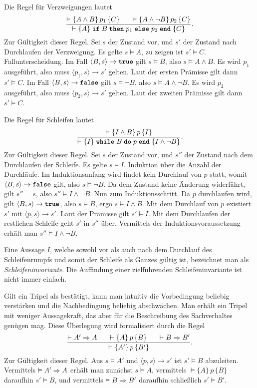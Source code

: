 Die Regel für Verzweigungen lautet
\[\dfrac{\vdash\{A\land B\}\,p_1\,\{C\}\quad\;\;\vdash\{A\land\lnot B\}\,p_2\,\{C\}}
{\vdash\{A\}\;\kw{if}\;B\;\kw{then}\;p_1\;\kw{else}\;p_2\;\kw{end}\;\{C\}}.\]
Zur Gültigkeit dieser Regel. Sei $s$ der Zustand vor, und $s'$ der
Zustand nach Durchlaufen der Verzweigung. Es gelte $s\models A$, zu
zeigen ist $s'\models C$. Fallunterscheidung. Im Fall
$\langle B,s\rangle\to\kw{true}$
gilt $s\models B$, also $s\models A\land B$. Es wird $p_1$ ausgeführt,
also muss $\langle p_1,s\rangle\to s'$ gelten. Laut der ersten Prämisse
gilt dann $s'\models C$. Im Fall $\langle B,s\rangle\to\kw{false}$
gilt $s\models\lnot B$, also $s\models A\land\lnot B$. Es wird $p_2$
ausgeführt, also muss $\langle p_2,s\rangle\to s'$ gelten. Laut der
zweiten Prämisse gilt dann $s'\models C$.

Die Regel für Schleifen lautet
\[\dfrac{\vdash\{I\land B\}\,p\,\{I\}}
{\vdash\{I\}\;\kw{while}\;B\;\kw{do}\;p\;\kw{end}\;\{I\land\lnot B\}}.\]
Zur Gültigkeit dieser Regel. Sei $s$ der Zustand vor, und $s''$
der Zustand nach dem Durchlaufen der Schleife. Es gelte $s\models I$.
Induktion über die Anzahl der Durchläufe. Im Induktionsanfang wird findet
kein Durchlauf von  $p$ statt, womit $\langle B,s\rangle\to\kw{false}$
gilt, also $s\models\lnot B$. Da dem Zustand keine Änderung widerfährt,
gilt $s''=s$, also $s''\models I\land\lnot B$.
Nun zum Induktionsschritt. Da $p$ durchlaufen wird, gilt
$\langle B,s\rangle\to\kw{true}$, also $s\models B$,
ergo $s\models I\land B$. Mit dem Durchlauf von $p$ existiert
$s'$ mit $\langle p,s\rangle\to s'$. Laut der Prämisse gilt
$s'\models I$. Mit dem Durchlaufen der restlichen Schleife geht $s'$
in $s''$ über. Vermittels der Induktionsvoraussetzung erhält man
$s''\models I\land\lnot B$.

Eine Aussage $I$, welche sowohl vor als auch nach dem Durchlauf des
Schleifenrumpfs und somit der Schleife als Ganzes gültig ist, bezeichnet
man als \emph{Schleifeninvariante}. Die Auffindung einer zielführenden
Schleifeninvariante ist nicht immer einfach.

Gilt ein Tripel als bestätigt, kann man intuitiv die Vorbedingung beliebig
verstärken und die Nachbedingung beliebig abschwächen. Man erhält ein
Tripel mit weniger Aussagekraft, das aber für die Beschreibung des
Sachverhaltes genügen mag. Diese Überlegung wird formalisiert durch
die Regel
\[\dfrac{\vdash A'\Rightarrow A\quad\;\;\vdash\{A\}\,p\,\{B\}\quad\;\;\vdash B\Rightarrow B'}
{\vdash\{A'\}\,p\,\{B'\}}.\]
Zur Gültigkeit dieser Regel. Aus $s\models A'$ und
$\langle p,s\rangle\to s'$ ist $s'\models B$ abzuleiten.
Vermittels $\vDash A'\Rightarrow A$ erhält man zunächst $s\models A$,
vermittels $\models\{A\}\,p\,\{B\}$ daraufhin $s'\models B$,
und vermittels $\vDash B\Rightarrow B'$ daraufhin schließlich $s'\models B'$.

